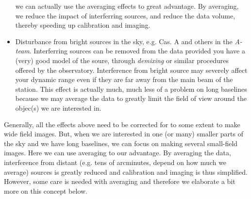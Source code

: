 \begin{itemize}
we can actually use the averaging effects to great advantage. By averaging, we reduce the impact of interferring sources, and reduce
the data volume, thereby speeding up calibration and imaging. 
\item Disturbance from bright sources in the sky, e.g. Cas. A and others in the \emph{A-team}. Interferring sources can be removed from the data
provided you have a (very) good model of the soure, through \emph{demixing} or similar procedures offered by the observatory. Interference
from bright source may severely affect your dynamic range even if they are far away from the main beam of the station. This effect
is actually much, much less of a problem on long baselines because we may average the data to greatly limit the field of view around 
the objec(s) we are interested in.
\end{itemize}

Generally, all the effects above need to be corrected for to some extent to
make wide field images. But, when we are interested in one (or many)
smaller parts of the sky and we have long baselines, we can focus on making several
small-field images. Here we can use averaging to our advantage. By averaging
the data, interference from distant (e.g. tens of arcminutes, depend on how
much we average) sources is greatly reduced and calibration and imaging is thus simplified.
However, some care is needed with averaging and therefore we elaborate a bit more on this concept below. 

